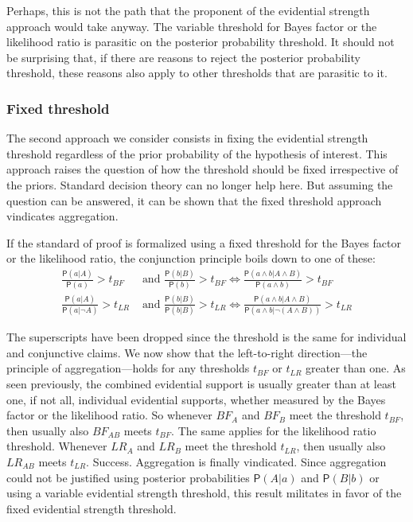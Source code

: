 \documentclass[
  10pt,
  dvipsnames,enabledeprecatedfontcommands]{scrartcl}
\newcommand{\n}{\neg}
\newcommand{\et}{\wedge}
\newcommand{\pr}[1]{\ensuremath{\mathsf{P}(#1)}}
\begin{document}
Perhaps, this is not the path that the proponent of the evidential
strength approach would take anyway. The variable threshold for Bayes
factor or the likelihood ratio is parasitic on the posterior probability
threshold. It should not be surprising that, if there are reasons to
reject the posterior probability threshold, these reasons also apply to
other thresholds that are parasitic to it.

\hypertarget{fixed-threshold}{%
\subsubsection{Fixed threshold}\label{fixed-threshold}}

The second approach we consider consists in fixing the evidential
strength threshold regardless of the prior probability of the hypothesis
of interest. This approach raises the question of how the threshold
should be fixed irrespective of the priors. Standard decision theory can
no longer help here. But assuming the question can be answered, it can
be shown that the fixed threshold approach vindicates aggregation.

If the standard of proof is formalized using a fixed threshold for the
Bayes factor or the likelihood ratio, the conjunction principle boils
down to one of these:
\begin{align*} \frac{\pr{a \vert A }}{\pr{a}}>t_{BF} &\mbox{ and } 
\frac{\pr{ b \vert B}}{\pr{b}}>t_{BF} \Leftrightarrow 
\frac{\pr{a \et b \vert A \et B}}{\pr{a \et b}}>t_{BF} \\
 \frac{\pr{a \vert A }}{\pr{a \vert \n A}}>t_{LR} &\mbox{ and } 
\frac{\pr{ b \vert B}}{\pr{b\vert B}}>t_{LR} \Leftrightarrow 
\frac{\pr{a \et b \vert A \et B}}{\pr{a \et b\vert \n (A \et B)}}>t_{LR}
\end{align*}

\noindent The superscripts have been dropped since the threshold is the
same for individual and conjunctive claims. We now show that the
left-to-right direction---the principle of aggregation---holds for any
thresholds \(t_{BF}\) or \(t_{LR}\) greater than one. As seen
previously, the combined evidential support is usually greater than at
least one, if not all, individual evidential supports, whether measured
by the Bayes factor or the likelihood ratio. So whenever \(BF_A\) and
\(BF_B\) meet the threshold \(t_{BF}\), then usually also \(BF_{AB}\)
meets \(t_{BF}\). The same applies for the likelihood ratio threshold.
Whenever \(LR_A\) and \(LR_B\) meet the threshold \(t_{LR}\), then
usually also \(LR_{AB}\) meets \(t_{LR}\). Success. Aggregation is
finally vindicated. Since aggregation could not be justified using
posterior probabilities \(\pr{A \vert a}\) and \(\pr{B \vert b}\) or
using a variable evidential strength threshold, this result militates in
favor of the fixed evidential strength threshold.
\end{document}
